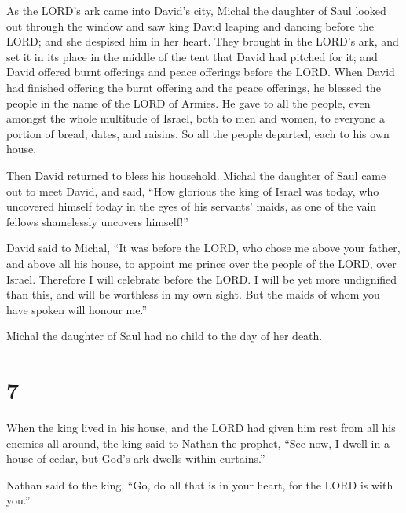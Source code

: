  As the LORD's ark came into David's city, Michal the
daughter of Saul looked out through the window and saw king David
leaping and dancing before the LORD; and she despised him in her heart.
 They brought in the LORD's ark, and set it in its place
in the middle of the tent that David had pitched for it; and David
offered burnt offerings and peace offerings before the LORD.
 When David had finished offering the burnt offering and
the peace offerings, he blessed the people in the name of the LORD of
Armies.  He gave to all the people, even amongst the
whole multitude of Israel, both to men and women, to everyone a portion
of bread, dates, and raisins. So all the people departed, each to his
own house.

 Then David returned to bless his household. Michal the
daughter of Saul came out to meet David, and said, ``How glorious the
king of Israel was today, who uncovered himself today in the eyes of his
servants' maids, as one of the vain fellows shamelessly uncovers
himself!''

 David said to Michal, ``It was before the LORD, who
chose me above your father, and above all his house, to appoint me
prince over the people of the LORD, over Israel. Therefore I will
celebrate before the LORD.  I will be yet more
undignified than this, and will be worthless in my own sight. But the
maids of whom you have spoken will honour me.''

 Michal the daughter of Saul had no child to the day of
her death.

\hypertarget{section-6}{%
\section{7}\label{section-6}}

 When the king lived in his house, and the LORD had given
him rest from all his enemies all around,  the king said
to Nathan the prophet, ``See now, I dwell in a house of cedar, but God's
ark dwells within curtains.''

 Nathan said to the king, ``Go, do all that is in your
heart, for the LORD is with you.''

